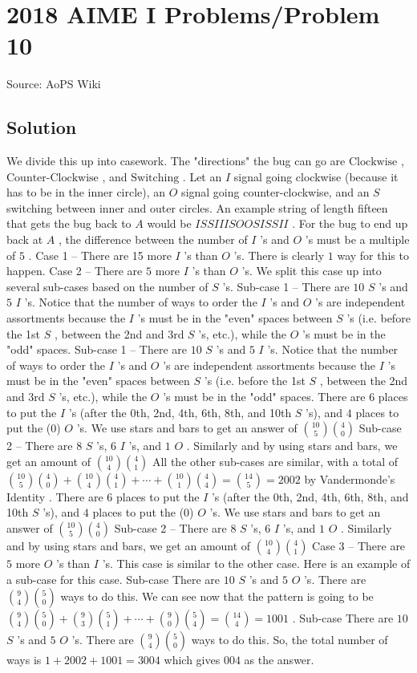 \documentclass[12pt]{article}
\begin{document}
\section*{{2018 AIME I Problems/Problem 10}}
Source: AoPS Wiki

\subsection*{Solution}
We divide this up into casework. The "directions" the bug can go are $\text{Clockwise}$ , $\text{Counter-Clockwise}$ , and $\text{Switching}$ . Let an $I$ signal going clockwise (because it has to be in the inner circle), an $O$ signal going counter-clockwise, and an $S$ switching between inner and outer circles. An example string of length fifteen that gets the bug back to $A$ would be $ISSIIISOOSISSII$ .
For the bug to end up back at $A$ , the difference between the number of $I$ 's and $O$ 's must be a multiple of $5$ . Case 1 -- There are 15 more $I$ 's than $O$ 's. There is clearly $1$ way for this to happen. Case 2 -- There are $5$ more $I$ 's than $O$ 's. We split this case up into several sub-cases based on the number of $S$ 's. Sub-case 1 -- There are $10$ $S$ 's and $5$ $I$ 's. Notice that the number of ways to order the $I$ 's and $O$ 's are independent assortments because the $I$ 's must be in the "even" spaces between $S$ 's (i.e. before the 1st $S$ , between the 2nd and 3rd $S$ 's, etc.), while the $O$ 's must be in the "odd" spaces. Sub-case 1 -- There are $10$ $S$ 's and $5$ $I$ 's. Notice that the number of ways to order the $I$ 's and $O$ 's are independent assortments because the $I$ 's must be in the "even" spaces between $S$ 's (i.e. before the 1st $S$ , between the 2nd and 3rd $S$ 's, etc.), while the $O$ 's must be in the "odd" spaces. There are $6$ places to put the $I$ 's (after the 0th, 2nd, 4th, 6th, 8th, and 10th $S$ 's), and $4$ places to put the (0) $O$ 's. We use stars and bars to get an answer of $\binom{10}{5}\binom{4}{0}$ Sub-case 2 -- There are $8$ $S$ 's, $6$ $I$ 's, and $1$ $O$ . Similarly and by using stars and bars, we get an amount of $\binom{10}{4}\binom{4}{1}$ All the other sub-cases are similar, with a total of $\binom{10}{5}\binom{4}{0}+\binom{10}{4}\binom{4}{1}+\cdots+\binom{10}{1}\binom{4}{4}=\binom{14}{5}=2002$ by Vandermonde's Identity . There are $6$ places to put the $I$ 's (after the 0th, 2nd, 4th, 6th, 8th, and 10th $S$ 's), and $4$ places to put the (0) $O$ 's. We use stars and bars to get an answer of $\binom{10}{5}\binom{4}{0}$ Sub-case 2 -- There are $8$ $S$ 's, $6$ $I$ 's, and $1$ $O$ . Similarly and by using stars and bars, we get an amount of $\binom{10}{4}\binom{4}{1}$ Case 3 -- There are $5$ more $O$ 's than $I$ 's. This case is similar to the other case. Here is an example of a sub-case for this case. Sub-case There are $10$ $S$ 's and $5$ $O$ 's. There are $\binom{9}{4}\binom{5}{0}$ ways to do this. We can see now that the pattern is going to be $\binom{9}{4}\binom{5}{0}+\binom{9}{3}\binom{5}{1}+\cdots+\binom{9}{0}\binom{5}{4}=\binom{14}{4}=1001$ . Sub-case There are $10$ $S$ 's and $5$ $O$ 's. There are $\binom{9}{4}\binom{5}{0}$ ways to do this. So, the total number of ways is $1+2002+1001=3004$ which gives $\boxed{004}$ as the answer.
\end{document}
